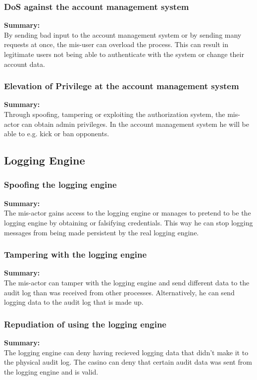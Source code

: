 \documentclass[a4paper,11pt]{report}
\begin{document}
\subsubsection{DoS against the account management system}
\label{AccountManagementCasesD}
\textbf{Summary:} \\
By sending bad input to the account management system or by sending many requests at once, the mis-user can overload the process. This can result in legitimate users not being able to authenticate with the system or change their account data.

\subsubsection{Elevation of Privilege at the account management system}
\label{AccountManagementCasesE}
\textbf{Summary:} \\
Through spoofing, tampering or exploiting the authorization system, the mis-actor can obtain admin privileges. In the account management system he will be able to e.g. kick or ban opponents.

\subsection{Logging Engine}
\label{LoggingEngineCases}

\subsubsection{Spoofing the logging engine}
\label{LoggingEngineCasesS}
\textbf{Summary:} \\
The mis-actor gains access to the logging engine or manages to pretend to be the logging engine by obtaining or falsifying credentials. This way he can stop logging messages from being made persistent by the real logging engine.

\subsubsection{Tampering with the logging engine}
\label{LoggingEngineCasesT}
\textbf{Summary:} \\
The mis-actor can tamper with the logging engine and send different data to the audit log than was received from other processes. Alternatively, he can send logging data to the audit log that is made up.

\subsubsection{Repudiation of using the logging engine}
\label{LoggingEngineCasesR}
\textbf{Summary:} \\
The logging engine can deny having recieved logging data that didn't make it to the physical audit log. The casino can deny that certain audit data was sent from the logging engine and is valid.
\end{document}
